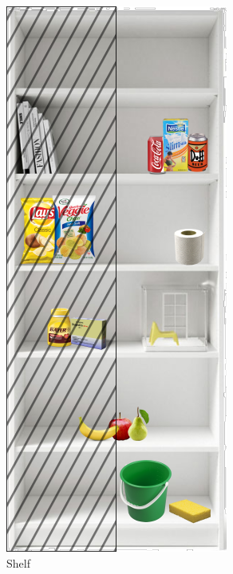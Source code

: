 \begin{minipage}{0.25\textwidth}
	\begin{figure}[H]
		\centering
		\includegraphics[width=\textwidth]{images/storing_groceries.png}%
		\vspace{-10pt}
		\caption{Shelf}
		\label{fig:storing_groceries_shelf}
	\end{figure}
\end{minipage}


